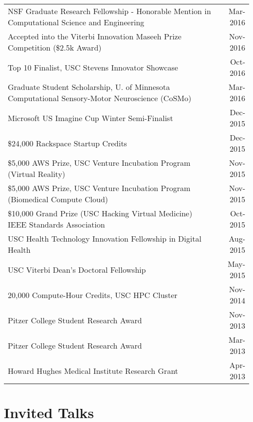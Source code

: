 \documentclass[10pt,a4paper]{article}
\begin{document}
  \vspace*{1mm}\noindent\begin{tabularx}{17cm}{X r}
    NSF Graduate Research Fellowship - Honorable Mention in Computational Science and Engineering& Mar-2016 \\
    Accepted into the Viterbi Innovation Maseeh Prize Competition (\$2.5k Award) & Nov-2016 \\
    Top 10 Finalist, USC Stevens Innovator Showcase & Oct-2016 \\
    Graduate Student Scholarship, U. of Minnesota Computational Sensory-Motor Neuroscience (CoSMo)& Mar-2016 \\
    Microsoft US Imagine Cup Winter Semi-Finalist & Dec-2015 \\
    \$24,000 Rackspace Startup Credits & Dec-2015\\
    \$5,000 AWS Prize, USC Venture Incubation Program (Virtual Reality) & Nov-2015\\
    \$5,000 AWS Prize, USC Venture Incubation Program (Biomedical Compute Cloud) & Nov-2015\\
    \$10,000 Grand Prize (USC Hacking Virtual Medicine) IEEE Standards Association  & Oct-2015\\ %
    USC Health Technology Innovation Fellowship in Digital Health& Aug-2015\\ 
    USC Viterbi Dean's Doctoral Fellowship  & May-2015 \\
    20,000 Compute-Hour Credits, USC HPC Cluster & Nov-2014 \\
    Pitzer College Student Research Award & Nov-2013 \\
    Pitzer College Student Research Award & Mar-2013 \\
    Howard Hughes Medical Institute Research Grant & Apr-2013
  \end{tabularx}



  \vspace*{2mm}\section*{Invited Talks}
\end{document}
